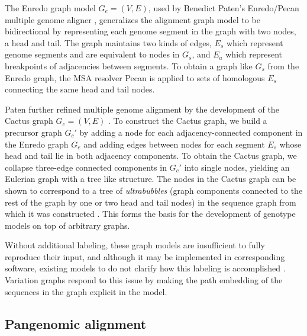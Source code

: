 The Enredo graph model $G_e = (V, E)$, used by Benedict Paten's Enredo/Pecan multiple genome aligner \cite{paten2008enredo}, generalizes the alignment graph model to be bidirectional by representing each genome segment in the graph with two nodes, a head and tail.
The graph maintains two kinds of edges, $E_s$ which represent genome segments and are equivalent to nodes in $G_s$, and $E_a$ which represent breakpoints of adjacencies between segments.
To obtain a graph like $G_s$ from the Enredo graph, the MSA resolver Pecan is applied to sets of homologous $E_s$ connecting the same head and tail nodes.

Paten further refined multiple genome alignment by the development of the Cactus graph $G_c = (V,E)$ \cite{paten2011cactus}.
To construct the Cactus graph, we build a precursor graph $G_c'$ by adding a node for each adjacency-connected component in the Enredo graph $G_e$ and adding edges between nodes for each segment $E_s$ whose head and tail lie in both adjacency components.
To obtain the Cactus graph, we collapse three-edge connected components in $G_c'$ into single nodes, yielding an Eulerian graph with a tree like structure.
The nodes in the Cactus graph can be shown to correspond to a tree of \emph{ultrabubbles} (graph components connected to the rest of the graph by one or two head and tail nodes) in the sequence graph from which it was constructed \cite{paten2018superbubbles}.
This forms the basis for the development of genotype models on top of arbitrary graphs.

Without additional labeling, these graph models are insufficient to fully reproduce their input, and although it may be implemented in corresponding software, existing models to do not clarify how this labeling is accomplished \cite{kehr2014genome}.
Variation graphs respond to this issue by making the path embedding of the sequences in the graph explicit in the model.

\subsection{Pangenomic alignment}

